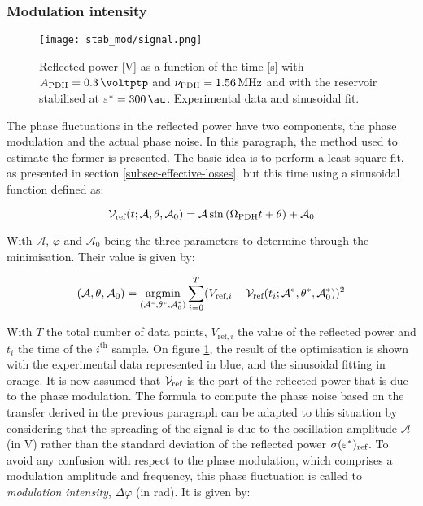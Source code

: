 
\subsubsection{Modulation intensity}

\begin{figure}
	\centering
	\texttt{[image: stab\_mod/signal.png]}
	\caption{Reflected power [\si{\volt}] as a function of the time [\si{\second}] with $\tind{A}{PDH} = \SI{0.3}{\voltptp}$ and $\nu_{\text{PDH}} = \SI{1.56}{\mega\hertz}$ and with the reservoir stabilised at $\epsilon^* = \SI{300}{\au}$. Experimental data and sinusoidal fit.}
	\label{stab_mod_signal}
\end{figure}

The phase fluctuations in the reflected power have two components, the \pdh phase modulation and the actual phase noise. In this paragraph, the method used to estimate the former is presented. The basic idea is to perform a least square fit, as presented in section \ref{subsec-effective-losses}, but this time using a sinusoidal function defined as:

\begin{equation}
	\mathcal{V}_{\text{ref}}(t;\mathcal{A},\theta,\mathcal{A}_0) = \mathcal{A}\sin{(\Omega_{\text{PDH}}t+\theta)}+\mathcal{A}_0
\end{equation}

With $\mathcal{A}$, $\varphi$ and $\mathcal{A}_0$ being the three parameters to determine through the minimisation. Their value is given by:

\begin{equation}
	(\mathcal{A},\theta,\mathcal{A}_0) = \underset{(\mathcal{A}^*,\theta^*,\mathcal{A}_0^*)}{\text{argmin}} \sum_{i=0}^T (V_{\text{ref},i} - \mathcal{V}_{\text{ref}}(t_i;\mathcal{A}^*,\theta^*,\mathcal{A}_0^*))^2
\end{equation}

With $T$ the total number of data points, $V_{\text{ref},i}$ the value of the reflected power and $t_i$ the time of the $i^{\text{th}}$ sample. On figure \ref{stab_mod_signal}, the result of the optimisation is shown with the experimental data represented in blue, and the sinusoidal fitting in orange. It is now assumed that $\mathcal{V}_{\text{ref}}$ is the part of the reflected power that is due to the phase modulation. The formula to compute the phase noise based on the transfer derived in the previous paragraph can be adapted to this situation by considering that the spreading of the signal is due to the oscillation amplitude $\mathcal{A}$ (in \si{\volt}) rather than the standard deviation of the reflected power $\sigma(\varepsilon^*)_{\text{ref}}$. To avoid any confusion with respect to the \pdh phase modulation, which comprises a modulation amplitude and frequency, this phase fluctuation is called to \textit{modulation intensity}, $\Delta \varphi$ (in \si{\radian}). It is given by:

